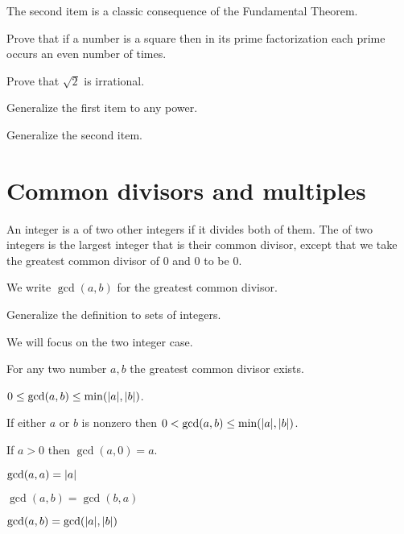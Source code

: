 \documentclass{ibl}
\begin{document}
\begin{ex} The second item is a classic consequence of the Fundamental Theorem.
\begin{exes}
\item Prove that if a number is a square then in its prime factorization 
  each prime occurs an even number of times.
\item Prove that $\sqrt{2}$ is irrational.
\item Generalize the first item to any power.
\item Generalize the second item.    
\end{exes}
\end{ex}


\section{Common divisors and multiples}

\begin{df}
An integer is a  of two other integers if it
divides both of them.
The  of two integers 
is the largest integer that is their common divisor,
except that we take the greatest common divisor of $0$ and $0$ 
to be $0$.
\end{df}

We write $\gcd(a,b)$ for the greatest common divisor.

\begin{ex}
Generalize the definition to sets of integers.
\end{ex}

\begin{ex}
We will focus on the two integer case.
\begin{exes} 
\item For any two number $a,b$ the greatest common divisor exists.
\item $0\leq \gcd(a,b)\leq\min(\lvert a\rvert,\lvert b\rvert)$.
\item If either $a$ or $b$ is nonzero then 
  $0< \gcd(a,b)\leq\min(\lvert a\rvert,\lvert b\rvert)$.
\item If $a>0$ then $\gcd(a,0)=a$.
\item $\gcd(a,a)=\lvert a\rvert$
\item $\gcd(a,b)=\gcd(b,a)$
\item $\gcd(a,b)=\gcd(\lvert a\rvert,\lvert b\rvert)$
\end{exes}  
\end{ex}
\end{document}
